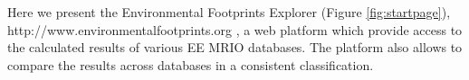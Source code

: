 Here we present the Environmental Footprints Explorer (Figure \ref{fig:startpage}), http://www.environmentalfootprints.org , a web platform which provide access to the calculated results of
various EE MRIO databases. The platform also allows to compare the results across databases in a consistent classification. 